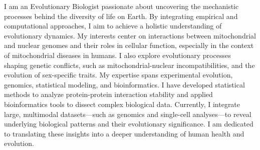 
\begin{cvparagraph}
I am an Evolutionary Biologist passionate about uncovering the mechanistic processes behind the diversity of life on Earth. By integrating empirical and computational approaches, I aim to achieve a holistic understanding of evolutionary dynamics. My interests center on interactions between mitochondrial and nuclear genomes and their roles in cellular function, especially in the context of mitochondrial diseases in humans. I also explore evolutionary processes shaping genetic conflicts, such as mitochondrial-nuclear incompatibilities, and the evolution of sex-specific traits. My expertise spans experimental evolution, genomics, statistical modeling, and bioinformatics. I have developed statistical methods to analyze protein-protein interaction stability and applied bioinformatics tools to dissect complex biological data. Currently, I integrate large, multimodal datasets—such as genomics and single-cell analyses—to reveal underlying biological patterns and their evolutionary significance. I am dedicated to translating these insights into a deeper understanding of human health and evolution.
\end{cvparagraph}